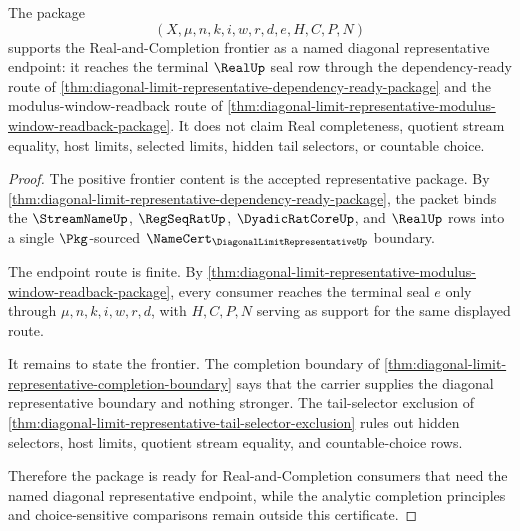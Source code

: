 \begin{theorem}
\label{thm:diagonal-limit-representative-real-completion-frontier-boundary}
The package
$$
(X,\mu,n,k,i,w,r,d,e,H,C,P,N)
$$
supports the Real-and-Completion frontier as a named diagonal representative endpoint: it reaches the terminal $\RealUp$ seal row through the dependency-ready route of \autoref{thm:diagonal-limit-representative-dependency-ready-package} and the modulus-window-readback route of \autoref{thm:diagonal-limit-representative-modulus-window-readback-package}. It does not claim Real completeness, quotient stream equality, host limits, selected limits, hidden tail selectors, or countable choice.
\end{theorem}
\begin{proof}
The positive frontier content is the accepted representative package. By \autoref{thm:diagonal-limit-representative-dependency-ready-package}, the packet binds the $\StreamNameUp$, $\RegSeqRatUp$, $\DyadicRatCoreUp$, and $\RealUp$ rows into a single $\Pkg$-sourced $\NameCert_{\DiagonalLimitRepresentativeUp}$ boundary.

The endpoint route is finite. By \autoref{thm:diagonal-limit-representative-modulus-window-readback-package}, every consumer reaches the terminal seal $e$ only through $\mu,n,k,i,w,r,d$, with $H,C,P,N$ serving as support for the same displayed route.

It remains to state the frontier. The completion boundary of \autoref{thm:diagonal-limit-representative-completion-boundary} says that the carrier supplies the diagonal representative boundary and nothing stronger. The tail-selector exclusion of \autoref{thm:diagonal-limit-representative-tail-selector-exclusion} rules out hidden selectors, host limits, quotient stream equality, and countable-choice rows.

Therefore the package is ready for Real-and-Completion consumers that need the named diagonal representative endpoint, while the analytic completion principles and choice-sensitive comparisons remain outside this certificate.
\end{proof}

